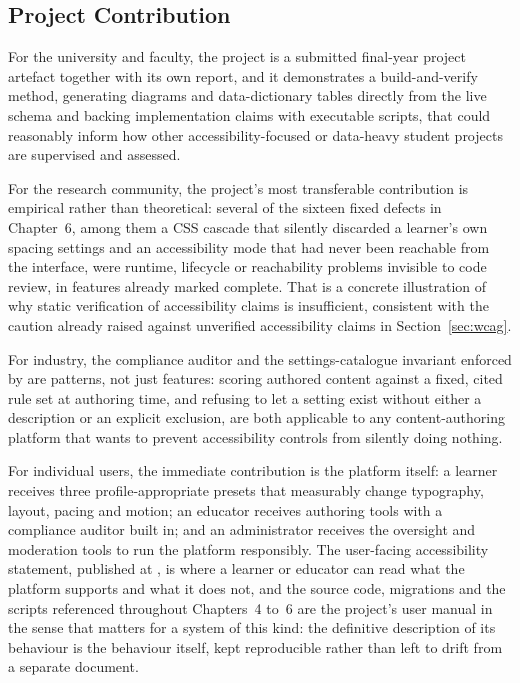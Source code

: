 \documentclass[12pt, oneside]{article} %
\newcommand{\tcode}[1]{\path{#1}}
\begin{document}
\subsection{Project Contribution}

For the university and faculty, the project is a submitted final-year project artefact together with its own report, and it demonstrates a build-and-verify method, generating diagrams and data-dictionary tables directly from the live schema and backing implementation claims with executable scripts, that could reasonably inform how other accessibility-focused or data-heavy student projects are supervised and assessed.

For the research community, the project's most transferable contribution is empirical rather than theoretical: several of the sixteen fixed defects in Chapter~6, among them a CSS cascade that silently discarded a learner's own spacing settings and an accessibility mode that had never been reachable from the interface, were runtime, lifecycle or reachability problems invisible to code review, in features already marked complete. That is a concrete illustration of why static verification of accessibility claims is insufficient, consistent with the caution already raised against unverified accessibility claims in Section~\ref{sec:wcag}.

For industry, the compliance auditor and the settings-catalogue invariant enforced by \tcode{npm run test:a11y-catalog} are patterns, not just features: scoring authored content against a fixed, cited rule set at authoring time, and refusing to let a setting exist without either a description or an explicit exclusion, are both applicable to any content-authoring platform that wants to prevent accessibility controls from silently doing nothing.

For individual users, the immediate contribution is the platform itself: a learner receives three profile-appropriate presets that measurably change typography, layout, pacing and motion; an educator receives authoring tools with a compliance auditor built in; and an administrator receives the oversight and moderation tools to run the platform responsibly. The user-facing accessibility statement, published at \tcode{/accessibility-statement}, is where a learner or educator can read what the platform supports and what it does not, and the source code, migrations and the scripts referenced throughout Chapters~4 to~6 are the project's user manual in the sense that matters for a system of this kind: the definitive description of its behaviour is the behaviour itself, kept reproducible rather than left to drift from a separate document.
\end{document}
